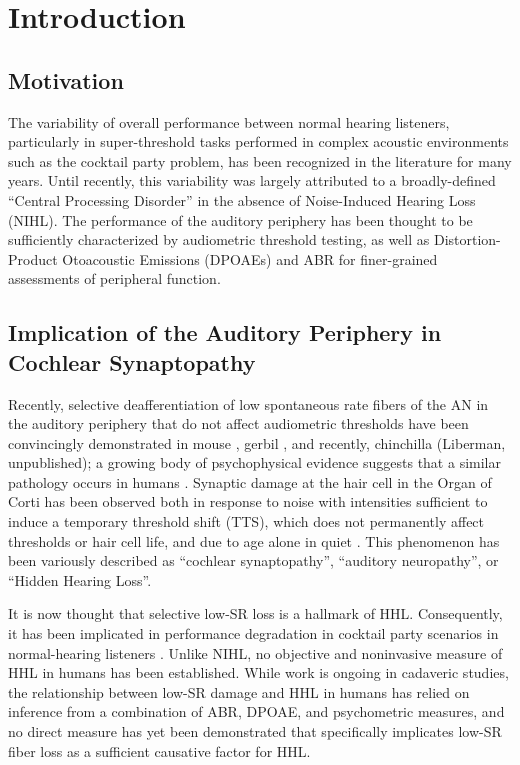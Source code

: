 \chapter{Introduction}
\label{chapter:Introduction}
\thispagestyle{myheadings}
\section{Motivation}
The variability of overall performance between normal hearing listeners, particularly in super-threshold tasks performed in complex acoustic environments such as the cocktail party problem, has been recognized in the literature for many years.  Until recently, this variability was largely attributed to a broadly-defined ``Central Processing Disorder'' in the absence of Noise-Induced Hearing Loss (NIHL). The performance of the auditory periphery has been thought to be sufficiently characterized by audiometric threshold testing, as well as Distortion-Product Otoacoustic Emissions (DPOAEs) and ABR for finer-grained assessments of peripheral function.

\section{Implication of the Auditory Periphery in Cochlear Synaptopathy}
Recently, selective deafferentiation of low spontaneous rate fibers of the AN in the auditory periphery that do not affect audiometric thresholds have been convincingly demonstrated in mouse \citep{Kujawa2009Adding}, gerbil \citep{Furman2013NoiseInduced}, and recently, chinchilla (Liberman, unpublished); a growing body of psychophysical evidence suggests that a similar pathology occurs in humans \citep{Bharadwaj2015Individual}.  Synaptic damage at the hair cell in the Organ of Corti has been observed both in response to noise with intensities sufficient to induce a temporary threshold shift (TTS), which does not permanently affect thresholds or hair cell life, and due to age alone in quiet \citep{Sergeyenko2013AgeRelated,Fernandez2015Aging}. This phenomenon has been variously described as ``cochlear synaptopathy''\citep{Bharadwaj2014Cochlear}, ``auditory neuropathy'', or ``Hidden Hearing Loss''.  

It is now thought that selective low-SR loss is a hallmark of HHL. Consequently, it has been implicated in performance degradation in cocktail party scenarios in normal-hearing listeners \citep{Bharadwaj2015Individual,Bharadwaj2014Cochlear}.  Unlike NIHL, no objective and noninvasive measure of HHL in humans has been established.  While work is ongoing in cadaveric studies, the relationship between low-SR damage and HHL in humans has relied on inference from a combination of ABR, DPOAE, and psychometric measures, and no direct measure has yet been demonstrated that specifically implicates low-SR fiber loss as a sufficient causative factor for HHL.

